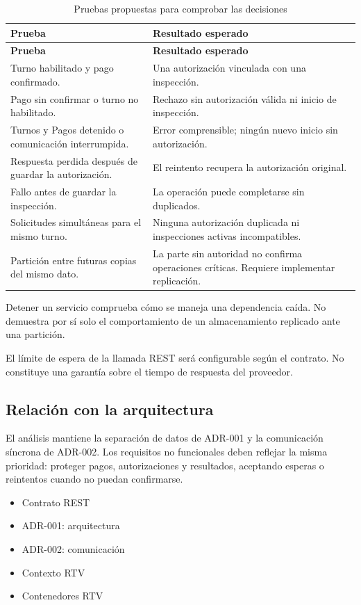 \documentclass[11pt,a4paper]{article}
\begin{document}
	\begin{xltabular}{\textwidth}{L{4.2cm}X}
		\caption{Pruebas propuestas para comprobar las decisiones}\label{tab:pruebas-cap}\\
		\toprule
		\textbf{Prueba} & \textbf{Resultado esperado} \\
		\midrule
		\endfirsthead
		\toprule
		\textbf{Prueba} & \textbf{Resultado esperado} \\
		\midrule
		\endhead
		\bottomrule
		\endfoot
		Turno habilitado y pago confirmado. & Una autorización vinculada con una inspección. \\
		Pago sin confirmar o turno no habilitado. & Rechazo sin autorización válida ni inicio de inspección. \\
		Turnos y Pagos detenido o comunicación interrumpida. & Error comprensible; ningún nuevo inicio sin autorización. \\
		Respuesta perdida después de guardar la autorización. & El reintento recupera la autorización original. \\
		Fallo antes de guardar la inspección. & La operación puede completarse sin duplicados. \\
		Solicitudes simultáneas para el mismo turno. & Ninguna autorización duplicada ni inspecciones activas incompatibles. \\
		Partición entre futuras copias del mismo dato. & La parte sin autoridad no confirma operaciones críticas. Requiere implementar replicación. \\
	\end{xltabular}
	
	Detener un servicio comprueba cómo se maneja una dependencia caída. No demuestra por sí solo el comportamiento de un almacenamiento replicado ante una partición.
	
	El límite de espera de la llamada REST será configurable según el contrato. No constituye una garantía sobre el tiempo de respuesta del proveedor.
	
	\subsection{Relación con la arquitectura}
	
	El análisis mantiene la separación de datos de ADR-001 y la comunicación síncrona de ADR-002. Los requisitos no funcionales deben reflejar la misma prioridad: proteger pagos, autorizaciones y resultados, aceptando esperas o reintentos cuando no puedan confirmarse.
	
	\begin{itemize}[nosep]
		\item Contrato REST
		\item ADR-001: arquitectura
		\item ADR-002: comunicación
		\item Contexto RTV
		\item Contenedores RTV
	\end{itemize}
	
\end{document}

